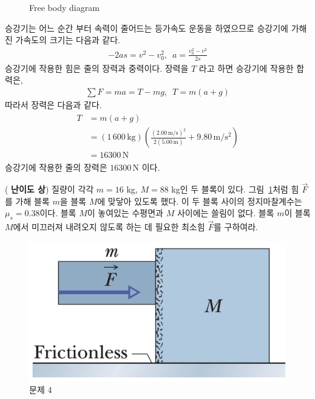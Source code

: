 \documentclass[floatfix,nofootinbib,superscriptaddress,fleqn]{revtex4-2}
\begin{document}
\begin{figure}[htp]
   \caption{Free body diagram}
\end{figure}
승강기는 어느 순간 부터 속력이 줄어드는 등가속도 운동을 하였으므로
 승강기에 가해진 가속도의 크기는 다음과 같다.
\begin{align}
  -2as = v^2-v_0^2,\,\,\, a = \frac{v_0^2-v^2}{2s}
\end{align}
승강기에 작용한 힘은 줄의 장력과 중력이다. 장력을 $T$ 라고 하면
 승강기에 작용한 합력은,
\begin{align}
  \sum F = ma = T-mg,\,\,\, T = m(a+g)
\end{align}
따라서 장력은 다음과 같다.
\begin{align}
  \begin{split}
    T  &= m(a+g)  \\ 
    &= (1\,600\,\mathrm{kg})\left(\frac{(2.00\,\mathrm{m/s})^2}
    {2(5.00\,\mathrm{m})}+9.80\,\mathrm{m/s^2}\right) \\
    &=16300\,\mathrm{N}
  \end{split}
\end{align}
승강기에 작용한 줄의 장력은 $16300\,\mathrm{N}$ 이다.




\vspace{2cm}

 (\textbf{\color{red} 난이도 상})
질량이 각각 $m=16$ kg, $M=88$ kg인 두 블록이 
있다. 그림~\ref{fig:4}처럼 힘 $\vec{F}$를 가해 블록 $m$을 블록 $M$에
맞닿아 있도록 했다. 이 두 블록 사이의 정지마찰계수는
$\mu_s=0.38$이다. 블록 $M$이 놓여있는 수평면과 $M$ 사이에는 쓸림이
없다.  블록 $m$이 블록 $M$에서 미끄러져 내려오지 않도록 하는 데 필요한
최소힘 $\vec{F}$를 구하여라. 
\begin{figure}[ht]
  \centering
\includegraphics[scale=0.3]{Qfig6-4-20220321.png}  
  \caption{문제 4}
  \label{fig:4}
\end{figure}\\
\end{document}

